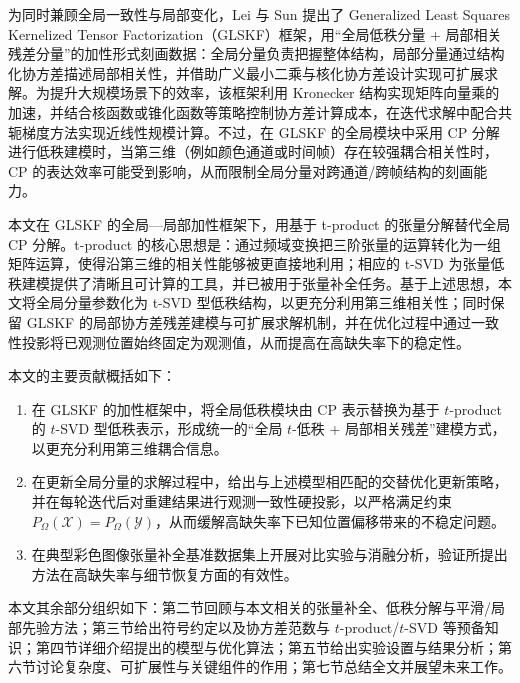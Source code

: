 \documentclass[UTF8]{ctexart}
\begin{document}
为同时兼顾全局一致性与局部变化，Lei 与 Sun 提出了 Generalized Least Squares Kernelized Tensor Factorization（GLSKF）框架\cite{lei2024glskf}，用“全局低秩分量 + 局部相关残差分量”的加性形式刻画数据：全局分量负责把握整体结构，局部分量通过结构化协方差描述局部相关性，并借助广义最小二乘与核化协方差设计实现可扩展求解。为提升大规模场景下的效率，该框架利用 Kronecker 结构实现矩阵向量乘的加速\cite{allen2014glsmd}，并结合核函数或锥化函数等策略控制协方差计算成本\cite{gneiting2002compact,furrer2006tapering}，在迭代求解中配合共轭梯度方法实现近线性规模计算\cite{hestenes1952cg}。不过，在 GLSKF 的全局模块中采用 CP 分解进行低秩建模时，当第三维（例如颜色通道或时间帧）存在较强耦合相关性时，CP 的表达效率可能受到影响，从而限制全局分量对跨通道/跨帧结构的刻画能力。

本文在 GLSKF 的全局—局部加性框架下，用基于 t-product 的张量分解替代全局 CP 分解。t-product 的核心思想是：通过频域变换把三阶张量的运算转化为一组矩阵运算，使得沿第三维的相关性能够被更直接地利用\cite{kilmer2011factorization,kilmer2013operators}；相应的 t-SVD 为张量低秩建模提供了清晰且可计算的工具，并已被用于张量补全任务\cite{zhang2017tsvd}。基于上述思想，本文将全局分量参数化为 t-SVD 型低秩结构，以更充分利用第三维相关性；同时保留 GLSKF 的局部协方差残差建模与可扩展求解机制，并在优化过程中通过一致性投影将已观测位置始终固定为观测值，从而提高在高缺失率下的稳定性\cite{boyd2011admm}。

本文的主要贡献概括如下：
\begin{enumerate}
  \item 在 GLSKF 的加性框架中，将全局低秩模块由 CP 表示替换为基于 $t$-product 的 $t$-SVD 型低秩表示，形成统一的“全局 $t$-低秩 + 局部相关残差”建模方式，以更充分利用第三维耦合信息\cite{lei2024glskf,zhang2017tsvd}。
  \item 在更新全局分量的求解过程中，给出与上述模型相匹配的交替优化更新策略，并在每轮迭代后对重建结果进行观测一致性硬投影，以严格满足约束$P_{\Omega}(\mathcal{X})=P_{\Omega}(\mathcal{Y})$，从而缓解高缺失率下已知位置偏移带来的不稳定问题。
  \item 在典型彩色图像张量补全基准数据集上开展对比实验与消融分析，验证所提出方法在高缺失率与细节恢复方面的有效性\cite{usc_sipi_database}。
\end{enumerate}

本文其余部分组织如下：第二节回顾与本文相关的张量补全、低秩分解与平滑/局部先验方法；第三节给出符号约定以及协方差范数与 $t$-product/$t$-SVD 等预备知识；第四节详细介绍提出的模型与优化算法；第五节给出实验设置与结果分析；第六节讨论复杂度、可扩展性与关键组件的作用；第七节总结全文并展望未来工作。
\end{document}

